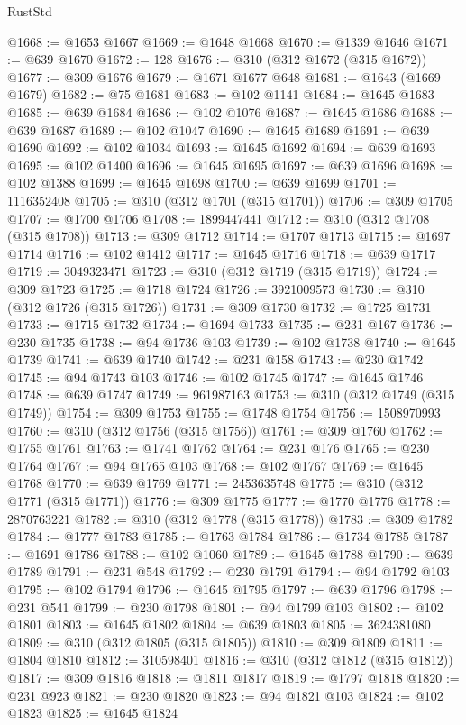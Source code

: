 \begin{lexlean}{RustStd}
\begin{coremodule}
{\begin{coremodule}
{{{{{{{{{{{{{{{{{{{{{{{{{{{{{{{{{{{{{@1668 := @1653 @1667
@1669 := @1648 @1668
@1670 := @1339 @1646
@1671 := @639 @1670
@1672 := 128
@1676 := @310 (@312 @1672 (@315 @1672))
@1677 := @309 @1676
@1679 := @1671 @1677 @648
@1681 := @1643 (@1669 @1679)
@1682 := @75 @1681
@1683 := @102 @1141
@1684 := @1645 @1683
@1685 := @639 @1684
@1686 := @102 @1076
@1687 := @1645 @1686
@1688 := @639 @1687
@1689 := @102 @1047
@1690 := @1645 @1689
@1691 := @639 @1690
@1692 := @102 @1034
@1693 := @1645 @1692
@1694 := @639 @1693
@1695 := @102 @1400
@1696 := @1645 @1695
@1697 := @639 @1696
@1698 := @102 @1388
@1699 := @1645 @1698
@1700 := @639 @1699
@1701 := 1116352408
@1705 := @310 (@312 @1701 (@315 @1701))
@1706 := @309 @1705
@1707 := @1700 @1706
@1708 := 1899447441
@1712 := @310 (@312 @1708 (@315 @1708))
@1713 := @309 @1712
@1714 := @1707 @1713
@1715 := @1697 @1714
@1716 := @102 @1412
@1717 := @1645 @1716
@1718 := @639 @1717
@1719 := 3049323471
@1723 := @310 (@312 @1719 (@315 @1719))
@1724 := @309 @1723
@1725 := @1718 @1724
@1726 := 3921009573
@1730 := @310 (@312 @1726 (@315 @1726))
@1731 := @309 @1730
@1732 := @1725 @1731
@1733 := @1715 @1732
@1734 := @1694 @1733
@1735 := @231 @167
@1736 := @230 @1735
@1738 := @94 @1736 @103
@1739 := @102 @1738
@1740 := @1645 @1739
@1741 := @639 @1740
@1742 := @231 @158
@1743 := @230 @1742
@1745 := @94 @1743 @103
@1746 := @102 @1745
@1747 := @1645 @1746
@1748 := @639 @1747
@1749 := 961987163
@1753 := @310 (@312 @1749 (@315 @1749))
@1754 := @309 @1753
@1755 := @1748 @1754
@1756 := 1508970993
@1760 := @310 (@312 @1756 (@315 @1756))
@1761 := @309 @1760
@1762 := @1755 @1761
@1763 := @1741 @1762
@1764 := @231 @176
@1765 := @230 @1764
@1767 := @94 @1765 @103
@1768 := @102 @1767
@1769 := @1645 @1768
@1770 := @639 @1769
@1771 := 2453635748
@1775 := @310 (@312 @1771 (@315 @1771))
@1776 := @309 @1775
@1777 := @1770 @1776
@1778 := 2870763221
@1782 := @310 (@312 @1778 (@315 @1778))
@1783 := @309 @1782
@1784 := @1777 @1783
@1785 := @1763 @1784
@1786 := @1734 @1785
@1787 := @1691 @1786
@1788 := @102 @1060
@1789 := @1645 @1788
@1790 := @639 @1789
@1791 := @231 @548
@1792 := @230 @1791
@1794 := @94 @1792 @103
@1795 := @102 @1794
@1796 := @1645 @1795
@1797 := @639 @1796
@1798 := @231 @541
@1799 := @230 @1798
@1801 := @94 @1799 @103
@1802 := @102 @1801
@1803 := @1645 @1802
@1804 := @639 @1803
@1805 := 3624381080
@1809 := @310 (@312 @1805 (@315 @1805))
@1810 := @309 @1809
@1811 := @1804 @1810
@1812 := 310598401
@1816 := @310 (@312 @1812 (@315 @1812))
@1817 := @309 @1816
@1818 := @1811 @1817
@1819 := @1797 @1818
@1820 := @231 @923
@1821 := @230 @1820
@1823 := @94 @1821 @103
@1824 := @102 @1823
@1825 := @1645 @1824
}}}}}}}}}}}}}}}}}}}}}}}}}}}}}}}}}}}}}
\end{coremodule}}
\end{coremodule}
\end{lexlean}
